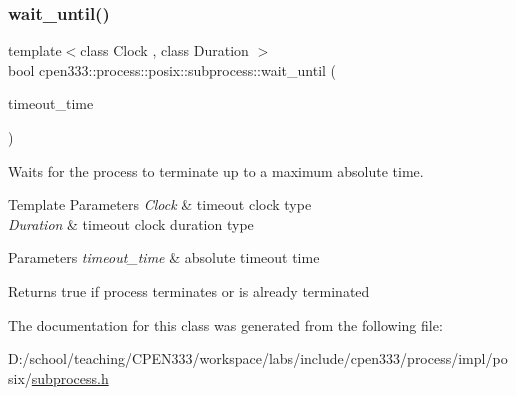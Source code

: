 \subsubsection{\texorpdfstring{wait\+\_\+until()}{wait\_until()}}
{\footnotesize\ttfamily template$<$class Clock , class Duration $>$ \\
bool cpen333\+::process\+::posix\+::subprocess\+::wait\+\_\+until (\begin{DoxyParamCaption}\item[{const std\+::chrono\+::time\+\_\+point$<$ Clock, Duration $>$ \&}]{timeout\+\_\+time }\end{DoxyParamCaption})\hspace{0.3cm}{\ttfamily [inline]}}



Waits for the process to terminate up to a maximum absolute time. 


\begin{DoxyTemplParams}{Template Parameters}
{\em Clock} & timeout clock type \\
\hline
{\em Duration} & timeout clock duration type \\
\hline
\end{DoxyTemplParams}

\begin{DoxyParams}{Parameters}
{\em timeout\+\_\+time} & absolute timeout time \\
\hline
\end{DoxyParams}
\begin{DoxyReturn}{Returns}
true if process terminates or is already terminated 
\end{DoxyReturn}


The documentation for this class was generated from the following file\+:\begin{DoxyCompactItemize}
\item 
D\+:/school/teaching/\+C\+P\+E\+N333/workspace/labs/include/cpen333/process/impl/posix/\hyperlink{impl_2posix_2subprocess_8h}{subprocess.\+h}\end{DoxyCompactItemize}
